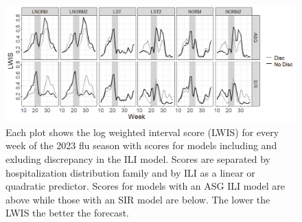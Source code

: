 \documentclass[ba]{imsart}
\theoremstyle{plain}
\theoremstyle{definition}
\theoremstyle{remark}
\begin{document}
\begin{supplement}
\begin{figure}[hbt!]
    \includegraphics[scale = .6]{Images/lwis_ln_us_full_season.png}
    \caption{Each plot shows the log weighted interval score (LWIS) for every 
    week of the 2023 flu season with scores for models including and exluding 
    discrepancy in the ILI model. Scores are separated by hospitalization 
    distribution family and by ILI as a linear or quadratic predictor. Scores 
    for models with an ASG ILI model are above while those with an SIR model 
    are below. The lower the LWIS the better the forecast.}
    \label{fig:us_lwis}
\end{figure}

%     



\begin{figure}[hbt!]
    

\end{figure}
\end{supplement}
\end{document}

